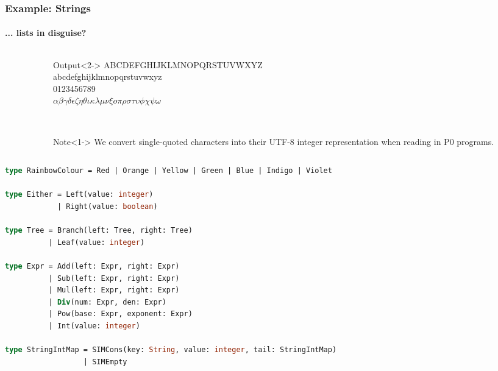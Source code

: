\documentclass{beamer}
\newcommand\omicron{o}
\begin{document}
\begin{frame}
\frametitle{Example: Strings}
\framesubtitle{... lists in disguise?}
    \begin{columns}[T,onlytextwidth]
        \begin{column}{.65\textwidth}
            \begin{minipage}{\textwidth}
                \usebox{\exampleString}
            \end{minipage}
        \end{column}
        \begin{column}{.35\textwidth}
            \begin{onlyenv}
                \begin{minipage}{\textwidth}
                    \begin{block}{Output}<2->\tiny
                        ABCDEFGHIJKLMNOPQRSTUVWXYZ\\
                        abcdefghijklmnopqrstuvwxyz\\
                        0123456789\\
                        $\alpha\beta\gamma\delta\epsilon\zeta\eta\theta\iota\kappa\lambda\mu\nu\xi\omicron\pi\rho\sigma\tau\upsilon\phi\chi\psi\omega$
                    \end{block}
                    
                    \ \\
                    
                    \begin{block}{Note}<1->\tiny
                        We convert single-quoted characters into their UTF-8 integer representation when reading in P0 programs.
                    \end{block}
                \end{minipage}
            \end{onlyenv}
        \end{column}
    \end{columns}
\end{frame}



\begin{lrbox}{\exampleImagination}
\begin{lstlisting}[language=Pascal,basicstyle=\tiny]
type RainbowColour = Red | Orange | Yellow | Green | Blue | Indigo | Violet

type Either = Left(value: integer)
            | Right(value: boolean)

type Tree = Branch(left: Tree, right: Tree)
          | Leaf(value: integer)

type Expr = Add(left: Expr, right: Expr)
          | Sub(left: Expr, right: Expr)
          | Mul(left: Expr, right: Expr)
          | Div(num: Expr, den: Expr)
          | Pow(base: Expr, exponent: Expr)
          | Int(value: integer)

type StringIntMap = SIMCons(key: String, value: integer, tail: StringIntMap)
                  | SIMEmpty

\end{lstlisting}
\end{lrbox}
\end{document}
